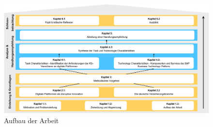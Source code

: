 \begin{figure}[h]
    \centering
    \includegraphics[width=1\textwidth]{img/Aufbau_der_Arbeit.jpg}
    \caption[Aufbau der Arbeit]{Aufbau der Arbeit\autocite{Aufbau}}
    \label{fig:Aufbau}
\end{figure}


\newpage